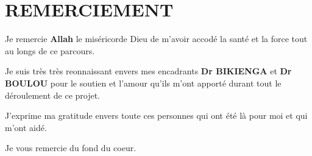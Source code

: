 \chapter*{REMERCIEMENT}
\thispagestyle{MyStyle}

 {\huge Je} remercie \textbf{Allah} le miséricorde Dieu de m'avoir accodé la santé et la force tout au longs de ce parcours.
 
 
 {\huge Je} suis très très reonnaissant envers mes encadrants \textbf{Dr BIKIENGA} et \textbf{Dr  BOULOU} pour le soutien et l'amour qu'ils m'ont apporté durant tout le déroulement de ce projet. 
 
 {\huge J}'exprime ma gratitude envers toute ces personnes qui ont été là pour moi et qui m'ont aidé.
 
 \vspace{1 cm}
 \hspace{8 cm}
 {\huge Je} vous remercie du fond du coeur.
 